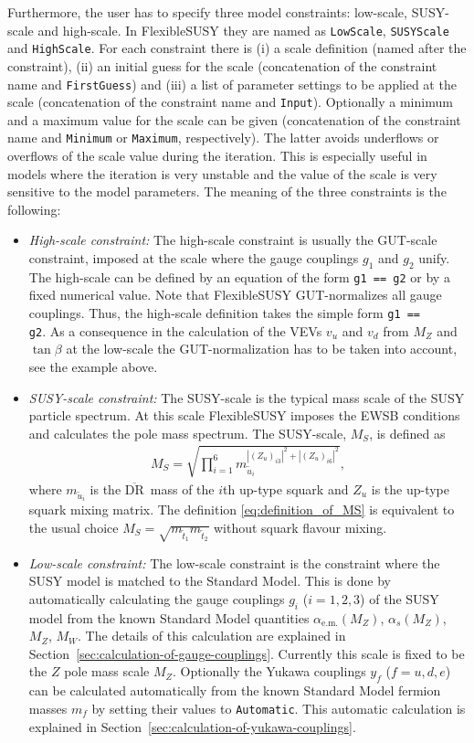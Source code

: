 \documentclass[final,3p,11pt,pdflatex]{elsarticle}
\makeatletter
\newcommand{\fs}{FlexibleSUSY\@\xspace}
\newcommand{\code}[1]{\lstinline|#1|}  %
\newcommand{\textoverline}[1]{$\overline{\mbox{#1}}$}
\newcommand{\DRbar}{\textoverline{DR}\xspace}
\newcommand{\secref}[1]{Section~\ref{#1}}
\makeatother
\begin{document}
Furthermore, the user has to specify three model constraints:
low-scale, SUSY-scale and high-scale.  In \fs they are named as
\code{LowScale}, \code{SUSYScale} and \code{HighScale}.  For each
constraint there is (i) a scale definition (named after the
constraint), (ii) an initial guess for the scale (concatenation of the
constraint name and \code{FirstGuess}) and (iii) a list of parameter
settings to be applied at the scale (concatenation of the constraint
name and \code{Input}).  Optionally a minimum and a maximum value for
the scale can be given (concatenation of the constraint name and
\code{Minimum} or \code{Maximum}, respectively).  The latter avoids
underflows or overflows of the scale value during the iteration.  This
is especially useful in models where the iteration is very unstable
and the value of the scale is very sensitive to the model parameters.
The meaning of the three constraints is the following:
%
\begin{itemize}
\item \emph{High-scale constraint:} The high-scale constraint is
  usually the GUT-scale constraint, imposed at the scale where the
  gauge couplings $g_1$ and $g_2$ unify.  The high-scale can be
  defined by an equation of the form \code{g1 == g2} or by a fixed
  numerical value.  Note that \fs GUT-normalizes all gauge couplings.
  Thus, the high-scale definition takes the simple form \code{g1 ==
    g2}.  As a consequence in the calculation of the VEVs $v_u$ and
  $v_d$ from $M_Z$ and $\tan\beta$ at the low-scale the
  GUT-normalization has to be taken into account, see the example
  above.
%
\item \emph{SUSY-scale constraint:} The SUSY-scale is the typical mass
  scale of the SUSY particle spectrum.  At this scale \fs imposes the
  EWSB conditions and calculates the pole mass spectrum.  The
  SUSY-scale, $M_S$, is defined as
  \begin{align}
    M_S = \sqrt{\prod_{i=1}^6 m_{\tilde{u}_i}^{|(Z_u)_{i3}|^2 + |(Z_u)_{i6}|^2}} ,
    \label{eq:definition_of_MS}
  \end{align}
  where $m_{\tilde{u}_i}$ is the \DRbar\ mass of the $i$th up-type
  squark and $Z_u$ is the up-type squark mixing matrix.  The
  definition \eqref{eq:definition_of_MS} is equivalent to the usual
  choice $M_S = \sqrt{m_{\tilde{t}_1}m_{\tilde{t}_2}}$ without squark
  flavour mixing.
%
\item \emph{Low-scale constraint:} The low-scale constraint is the
  constraint where the SUSY model is matched to the Standard Model.
  This is done by automatically calculating the gauge couplings $g_i$
  ($i=1,2,3$) of the SUSY model from the known Standard Model
  quantities $\alpha_{\text{e.m.}}(M_Z)$, $\alpha_{s}(M_Z)$, $M_Z$,
  $M_W$.  The details of this calculation are explained in
  \secref{sec:calculation-of-gauge-couplings}.  Currently this scale
  is fixed to be the $Z$ pole mass scale $M_Z$.  Optionally the Yukawa
  couplings $y_f$ ($f=u,d,e$) can be calculated automatically from the
  known Standard Model fermion masses $m_f$ by setting their values to
  \code{Automatic}.  This automatic calculation is explained in
  \secref{sec:calculation-of-yukawa-couplings}.
\end{itemize}
\end{document}
